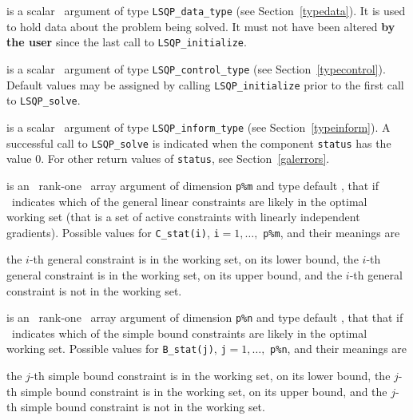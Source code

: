 \documentclass{galahad}
\newcommand{\packagename}{LSQP}
\begin{document}
\begin{description}
 is a scalar \intentinout\ argument of type 
{\tt \packagename\_data\_type}
(see Section~\ref{typedata}). It is used to hold data about the problem being 
solved. It must not have been altered {\bf by the user} since the last call to 
{\tt \packagename\_initialize}.

 is a scalar \intentin\ argument of type 
{\tt \packagename\_control\_type}
(see Section~\ref{typecontrol}). Default values may be assigned by calling 
{\tt \packagename\_initialize} prior to the first call to 
{\tt \packagename\_solve}.

 is a scalar \intentinout\ argument of type 
{\tt \packagename\_inform\_type}
(see Section~\ref{typeinform}). A successful call to
{\tt \packagename\_solve}
is indicated when the  component {\tt status} has the value 0. 
For other return values of {\tt status}, see Section~\ref{galerrors}.

 is an \optional\ rank-one \intentout\ array argument 
of dimension {\tt p\%m}
and type default \integer, that if \present\
indicates which of the general linear
constraints are likely in the optimal working set (that is a set of active
constraints with linearly independent gradients). Possible values for 
{\tt C\_stat(i)}, {\tt i}$=1, \ldots ,$ {\tt p\%m}, and their meanings are
\begin{description}
 the $i$-th general constraint 
is in the working set, on its lower bound,
 the $i$-th general constraint 
is in the working set, on its upper bound, and
  the $i$-th general constraint is not in the working set.
\end{description}

 is an \optional\ rank-one \intentout\ array argument 
of dimension {\tt p\%n}
and type default \integer, that that if \present\
indicates which of the simple bound 
constraints are likely in the optimal working set. Possible values for 
{\tt B\_stat(j)}, {\tt j}$=1, \ldots ,$ {\tt p\%n}, and their meanings are
\begin{description}
\itt{<0} the $j$-th simple bound constraint 
is in the working set, on its lower bound,
\itt{>0} the $j$-th simple bound constraint 
is in the working set, on its upper bound, and
\itt{0}  the $j$-th simple bound constraint is not in the working set.
\end{description}


\end{description}
\end{document}
